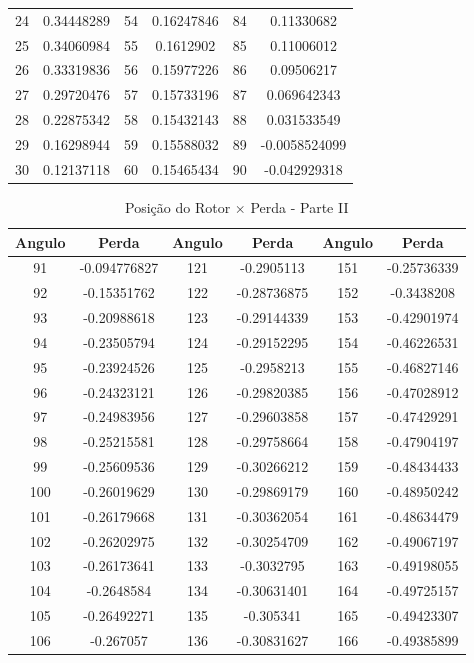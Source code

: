 \documentclass[
	12pt,				%
	openright,			%
	twoside,			%
	a4paper,			%
	english,			%
	french,				%
	spanish,			%
	brazil,				%
	]{abntex2}
\begin{document}
\begin{apendicesenv}
\begin{table}[H]
\begin{tabular}{c c| c c | c c}
24 & 0.34448289 & 54 & 0.16247846 & 84 & 0.11330682\\
25 & 0.34060984 & 55 & 0.1612902 & 85 & 0.11006012\\
26 & 0.33319836 & 56 & 0.15977226 & 86 & 0.09506217\\
27 & 0.29720476 & 57 & 0.15733196 & 87 & 0.069642343\\
28 & 0.22875342 & 58 & 0.15432143 & 88 & 0.031533549\\
29 & 0.16298944 & 59 & 0.15588032 & 89 & -0.0058524099\\
30 & 0.12137118 & 60 & 0.15465434 & 90 & -0.042929318
\end{tabular}
\end{table}

\newpage
\begin{table}[H]
\caption{Posição do Rotor $\times$  Perda - Parte II \label{tab:pr_ii}}
\centering
\begin{tabular}{c c| c c | c c}
Angulo & Perda & Angulo & Perda & Angulo & Perda \\
\hline 
91 & -0.094776827 & 121 & -0.2905113 & 151 & -0.25736339\\
92 & -0.15351762 & 122 & -0.28736875 & 152 & -0.3438208\\
93 & -0.20988618 & 123 & -0.29144339 & 153 & -0.42901974\\
94 & -0.23505794 & 124 & -0.29152295 & 154 & -0.46226531\\
95 & -0.23924526 & 125 & -0.2958213 & 155 & -0.46827146\\
96 & -0.24323121 & 126 & -0.29820385 & 156 & -0.47028912\\
97 & -0.24983956 & 127 & -0.29603858 & 157 & -0.47429291\\
98 & -0.25215581 & 128 & -0.29758664 & 158 & -0.47904197\\
99 & -0.25609536 & 129 & -0.30266212 & 159 & -0.48434433\\
100 & -0.26019629 & 130 & -0.29869179 & 160 & -0.48950242\\
101 & -0.26179668 & 131 & -0.30362054 & 161 & -0.48634479\\
102 & -0.26202975 & 132 & -0.30254709 & 162 & -0.49067197\\
103 & -0.26173641 & 133 & -0.3032795 & 163 & -0.49198055\\
104 & -0.2648584 & 134 & -0.30631401 & 164 & -0.49725157\\
105 & -0.26492271 & 135 & -0.305341 & 165 & -0.49423307\\
106 & -0.267057 & 136 & -0.30831627 & 166 & -0.49385899\\

\end{tabular}
\end{table}
\end{apendicesenv}
\end{document}

